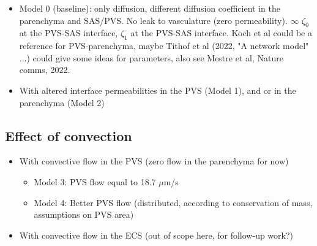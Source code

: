 \documentclass[fleqn,10pt]{wlscirep}
\begin{document}
\begin{itemize}
    \item Model 0 (baseline): only diffusion, different diffusion coefficient in the parenchyma and SAS/PVS. No leak to vasculature (zero permeability). $\infty$ $\zeta_0$ at the PVS-SAS interface, $\zeta_1$ at the PVS-SAS interface. Koch et al could be a reference for PVS-parenchyma, maybe Tithof et al (2022, "A network model" ...) could give some ideas for parameters, also see Mestre et al, Nature comms, 2022. 
    \item 
    With altered interface permeabilities in the PVS (Model 1), and or in the parenchyma (Model 2) 
    \end{itemize}

\begin{figure}
    \caption{}
    \label{fig:1}
\end{figure}

\subsection*{Effect of convection}
\begin{itemize}
    \item 
    With convective flow in the PVS (zero flow in the parenchyma for now)
    \begin{itemize}
        \item 
        Model 3: PVS flow equal to 18.7 $\mu$m/s
        \item 
        Model 4: Better PVS flow (distributed, according to conservation of mass, assumptions on PVS area)
    \end{itemize}    
    \item 
    With convective flow in the ECS (out of scope here, for follow-up work?)
\end{itemize}
\end{document}
